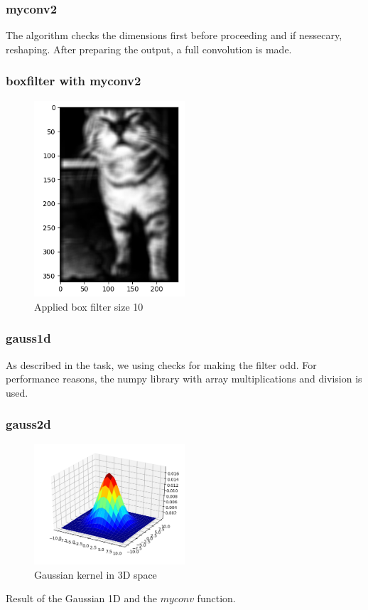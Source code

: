 \documentclass[12pt]{article}
\begin{document}
\subsubsection{myconv2}
The algorithm checks the dimensions first before proceeding and if nessecary, reshaping. After preparing the output,
a full convolution is made.

\pagebreak

\subsubsection{boxfilter with myconv2}
\begin{figure}[!htb]
    \centering
    \includegraphics[width=0.5\textwidth]{pics/boxFilter10}
    \caption{Applied box filter size 10}
  \end{figure}

\subsubsection{gauss1d}
As described in the task, we using checks for making the filter odd. For performance reasons,
the numpy library with array multiplications and division is used.

\pagebreak
\subsubsection{gauss2d}
\begin{figure}[!htb]
    \centering
    \includegraphics[width=0.5\textwidth]{pics/gaussPlot}
    \caption{Gaussian kernel in 3D space}
  \end{figure}
  Result of the Gaussian 1D and the $myconv$ function.
\end{document}
